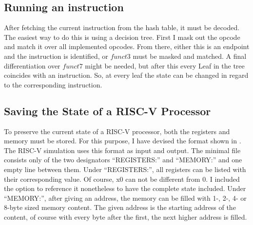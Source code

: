 

\subsection{Running an instruction}
After fetching the current instruction from the hash table, it must
be decoded. The easiest way to do this is using a decision tree.
First I mask out the opcode and match it over all implemented
opcodes. From there, either this is an endpoint and the instruction
is identified, or $funct3$ must be masked and matched. A final
differentiation over $funct7$ might be needed, but after this every
Leaf in the tree coincides with an instruction. So, at every leaf the
state can be changed in regard to the corresponding instruction.

\subsection{Saving the State of a RISC-V
      Processor}\label{sub:statefile}

To preserve the current state of a RISC-V processor, both the
registers and memory must be stored. For this purpose, I have devised
the format shown in . The RISC-V simulation
uses this format as input and output. The minimal file consists only
of the two designators \enquote{REGISTERS:} and \enquote{MEMORY:} and
one empty line between them. Under \enquote{REGISTERS:}, all
registers can be listed with their corresponding value. Of course, x0
can not be different from 0. I included the option to reference it
nonetheless to have the complete state included. Under
\enquote{MEMORY:}, after giving an address, the memory can be filled
with 1-, 2-, 4- or 8-byte sized memory content. The given address is
the starting address of the content, of course with every byte after
the first, the next higher address is filled.

